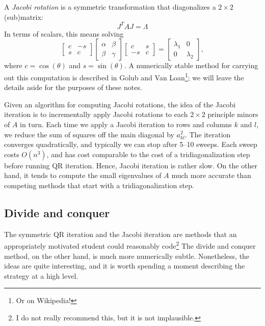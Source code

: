 \documentclass[12pt, leqno]{article} %
\begin{document}
A {\em Jacobi rotation} is a symmetric transformation that
diagonalizes a $2 \times 2$ (sub)matrix:
\[
  J^T A J = \Lambda
\]
In terms of scalars, this means solving
\[
  \begin{bmatrix} c & -s \\ s & c \end{bmatrix}
  \begin{bmatrix} \alpha & \beta \\ \beta & \gamma \end{bmatrix}
  \begin{bmatrix} c & s \\ -s & c \end{bmatrix} =
  \begin{bmatrix} \lambda_1 & 0 \\ 0 & \lambda_2 \end{bmatrix},
\]
where $c = \cos(\theta)$ and $s = \sin(\theta)$.  A numerically
stable method for carrying out this computation is described in
Golub and Van Loan\footnote{Or on Wikipedia!}; we will leave
the details aside for the purposes of these notes.

Given an algorithm for computing Jacobi rotations, the idea
of the Jacobi iteration is to incrementally apply Jacobi rotations
to each $2 \times 2$ principle minors of $A$ in turn.
%
%
%
Each time we apply a Jacobi iteration to rows and columns $k$ and $l$,
we reduce the sum of squares off the main diagonal by $a_{kl}^2$. The
iteration converges quadratically, and typically we can stop after 5--10
sweeps.  Each sweep costs $O(n^3)$, and has cost comparable to the cost
of a tridiagonalization step before running QR iteration.  Hence, Jacobi
iteration is rather slow.  On the other hand, it tends to compute the
small eigenvalues of $A$ much more accurate than competing methods that
start with a tridiagonalization step.

\subsection{Divide and conquer}

The symmetric QR iteration and the Jacobi iteration are methods that
an appropriately motivated student could reasonably code\footnote{%
I do not really recommend this, but it is not implausible.}
The divide and conquer method, on the other hand, is much more
numerically subtle.  Nonetheless, the ideas are quite interesting,
and it is worth spending a moment describing the strategy at a
high level.
\end{document}
